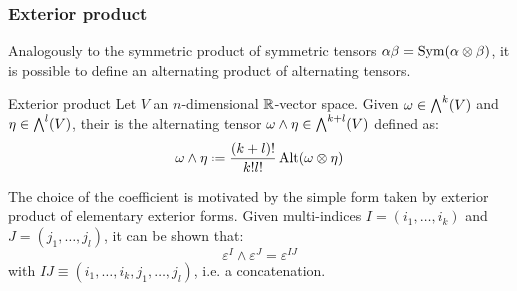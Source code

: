 \subsubsection{Exterior product}

Analogously to the symmetric product of symmetric tensors $ \alpha \beta = \operatorname{Sym} (\alpha \otimes \beta) $, it is possible to define an alternating product of alternating tensors.

\begin{definition}{Exterior product}{}
  Let $ V $ an $ n $-dimensional $ \mathbb{R} $-vector space. Given $ \omega \in {\bigwedge}^{k}(V) $ and $ \eta \in {\bigwedge}^{l}(V) $, their  is the alternating tensor $ \omega \wedge \eta \in {\bigwedge}^{k+l}(V) $ defined as:
  \begin{equation}
    \omega \wedge \eta \defeq \frac{(k+l)!}{k!l!} \Alt(\omega \otimes \eta)
  \end{equation}
\end{definition}

The choice of the coefficient is motivated by the simple form taken by exterior product of elementary exterior forms. Given multi-indices $ I = (i_1 , \dots , i_k) $ and $ J = (j_1 , \dots , j_l) $, it can be shown that:
\begin{equation}
  \varepsilon^I \wedge \varepsilon^J = \varepsilon^{IJ}
  \label{eq:eef-prod}
\end{equation}
with $ IJ \equiv (i_1 , \dots , i_k , j_1 , \dots , j_l) $, i.e. a concatenation.

